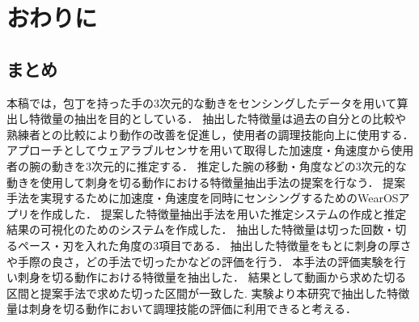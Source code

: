 \chapter{おわりに}
\section{まとめ}
本稿では，包丁を持った手の3次元的な動きをセンシングしたデータを用いて算出し特徴量の抽出を目的としている．
抽出した特徴量は過去の自分との比較や熟練者との比較により動作の改善を促進し，使用者の調理技能向上に使用する．
アプローチとしてウェアラブルセンサを用いて取得した加速度・角速度から使用者の腕の動きを3次元的に推定する．
推定した腕の移動・角度などの3次元的な動きを使用して刺身を切る動作における特徴量抽出手法の提案を行なう．
提案手法を実現するために加速度・角速度を同時にセンシングするためのWearOSアプリを作成した．
提案した特徴量抽出手法を用いた推定システムの作成と推定結果の可視化のためのシステムを作成した．
抽出した特徴量は切った回数・切るペース・刃を入れた角度の3項目である．
抽出した特徴量をもとに刺身の厚さや手際の良さ，どの手法で切ったかなどの評価を行う．
本手法の評価実験を行い刺身を切る動作における特徴量を抽出した．
結果として動画から求めた切る区間と提案手法で求めた切った区間が一致した.
実験より本研究で抽出した特徴量は刺身を切る動作において調理技能の評価に利用できると考える．






